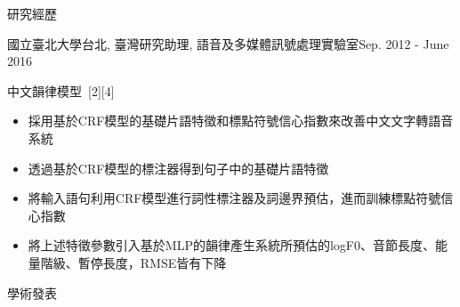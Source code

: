 \documentclass{resume} %
\begin{document}
\begin{rSection}{研究經歷}
\begin{rSubsection}{國立臺北大學}{台北, 臺灣}{研究助理, 語音及多媒體訊號處理實驗室}{Sep. 2012 - June 2016}
\begin{itemize}[label=$-$]
        \end{itemize}\vspace{0.5em}
        \item 中文韻律模型~[2][4]
        \begin{itemize}[label=$-$]
            \setlength \itemsep{-0.5em}
            \item 採用基於CRF模型的基礎片語特徵和標點符號信心指數來改善中文文字轉語音系統
            \item 透過基於CRF模型的標注器得到句子中的基礎片語特徵
            \item 將輸入語句利用CRF模型進行詞性標注器及詞邊界預估，進而訓練標點符號信心指數
            \item 將上述特徵參數引入基於MLP的韻律產生系統所預估的logF0、音節長度、能量階級、暫停長度，RMSE皆有下降
        \end{itemize}\vspace{0.5em}
    \end{rSubsection}
\end{rSection}

\begin{rSection}{學術發表}
    
    
    \begin{enumerate}[label={[\arabic*]}]
    \item {}
    \item {}
    \item {}
    \item {}
    \end{enumerate}    
\end{rSection}

\end{document}
